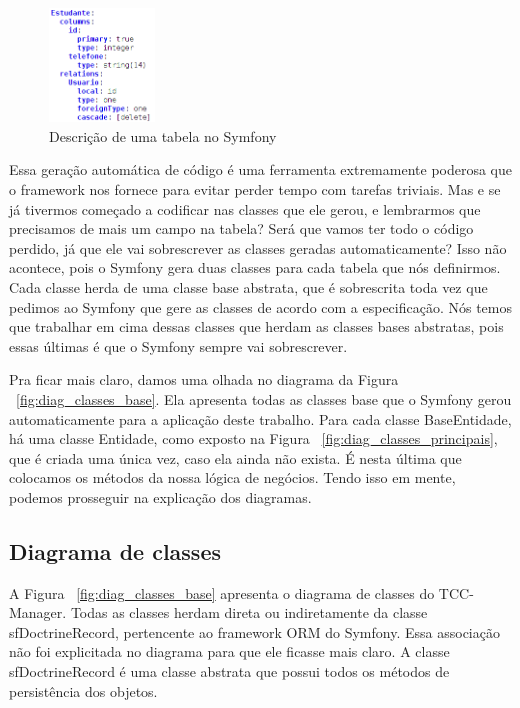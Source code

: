 \begin{figure}[htbp]
\centering
\includegraphics[width=0.25\textwidth]{fig/tabela_yaml.png}
\caption{Descrição de uma tabela no Symfony}
\label{fig:tabela_yaml}
\end{figure}

Essa geração automática de código é uma ferramenta extremamente poderosa que o framework nos
fornece para evitar perder tempo com tarefas triviais. Mas e se já tivermos começado a codificar
nas classes que ele gerou, e lembrarmos que precisamos de mais um campo na tabela? Será que
vamos ter todo o código perdido, já que ele vai sobrescrever as classes geradas automaticamente?
Isso não acontece, pois o Symfony gera duas classes para cada tabela que nós definirmos. Cada classe
herda de uma classe base abstrata, que é sobrescrita toda vez que pedimos ao Symfony que gere
as classes de acordo com a especificação. Nós temos que trabalhar em cima dessas classes que
herdam as classes bases abstratas, pois essas últimas é que o Symfony sempre vai sobrescrever.

Pra ficar mais claro, damos uma olhada no diagrama da Figura ~\ref{fig:diag_classes_base}. Ela
apresenta todas as classes base que o Symfony gerou automaticamente para a aplicação deste trabalho.
Para cada classe BaseEntidade, há uma classe Entidade, como exposto na Figura ~\ref{fig:diag_classes_principais}, 
que é criada uma única vez, caso ela ainda não exista. É nesta última que colocamos os métodos da nossa 
lógica de negócios. Tendo isso em mente, podemos prosseguir na explicação dos diagramas.

\subsection{Diagrama de classes}

A Figura ~\ref{fig:diag_classes_base} apresenta o diagrama de classes do TCC-Manager. Todas as classes
herdam direta ou indiretamente da classe sfDoctrineRecord, pertencente ao framework ORM do Symfony. 
Essa associação não foi explicitada no diagrama para que ele ficasse mais claro. A classe sfDoctrineRecord
é uma classe abstrata que possui todos os métodos de persistência dos objetos.


